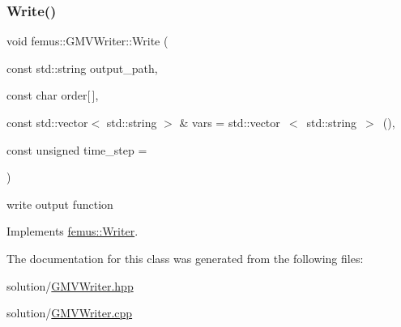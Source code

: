 \subsubsection{\texorpdfstring{Write()}{Write()}}
{\footnotesize\ttfamily void femus\+::\+G\+M\+V\+Writer\+::\+Write (\begin{DoxyParamCaption}\item[{const std\+::string}]{output\+\_\+path,  }\item[{const char}]{order\mbox{[}$\,$\mbox{]},  }\item[{const std\+::vector$<$ std\+::string $>$ \&}]{vars = {\ttfamily std\+:\+:vector~$<$~std\+:\+:string~$>$~()},  }\item[{const unsigned}]{time\+\_\+step = {} }\end{DoxyParamCaption})\hspace{0.3cm}{\ttfamily [virtual]}}

write output function 

Implements \mbox{\hyperlink{classfemus_1_1_writer_aa0f7400e0546946f317cc361397d97bd}{femus\+::\+Writer}}.



The documentation for this class was generated from the following files\+:\begin{DoxyCompactItemize}
\item 
solution/\mbox{\hyperlink{_g_m_v_writer_8hpp}{G\+M\+V\+Writer.\+hpp}}\item 
solution/\mbox{\hyperlink{_g_m_v_writer_8cpp}{G\+M\+V\+Writer.\+cpp}}\end{DoxyCompactItemize}
